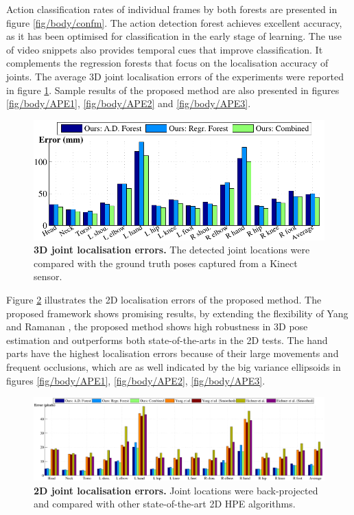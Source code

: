 Action classification rates of individual frames by both forests are presented in figure \ref{fig/body/confm}. 
The action detection forest achieves excellent accuracy, as it has been optimised for classification in the early stage of learning. The use of video snippets also provides temporal cues that improve classification. It complements the regression forests that focus on the localisation accuracy of joints.    
The average 3D joint localisation errors of the experiments were reported in figure \ref{fig/body/errorplot3d}. 
Sample results of the proposed method are also presented in figures \ref{fig/body/APE1}, \ref{fig/body/APE2} and \ref{fig/body/APE3}. 

\begin{figure}[ht]
\centering
	\includegraphics[width=0.8\linewidth]{fig/body/errplot3d.pdf} 
	\caption{\textbf{3D joint localisation errors.} The detected joint locations were compared with the ground truth poses captured from a Kinect sensor.}
\label{fig/body/errorplot3d}
\end{figure}

Figure \ref{fig/body/errorplot2d} illustrates the 2D localisation errors of the proposed method.
The proposed framework shows promising results, by extending the flexibility of Yang and Ramanan \cite{Yang2011}, the proposed method shows high robustness in 3D pose estimation and outperforms both state-of-the-arts in the 2D tests. The hand parts have the highest localisation errors because of their large movements and frequent occlusions, which are as well indicated by the big variance ellipsoids in figures \ref{fig/body/APE1}, \ref{fig/body/APE2}, \ref{fig/body/APE3}.

\begin{figure}[ht]
	\centering
	\includegraphics[width=1.00\linewidth]{fig/body/errplot2d.pdf} 
	\caption{\textbf{2D joint localisation errors.} Joint locations were back-projected and compared with other state-of-the-art 2D HPE algorithms.}
\label{fig/body/errorplot2d}
\end{figure} 

